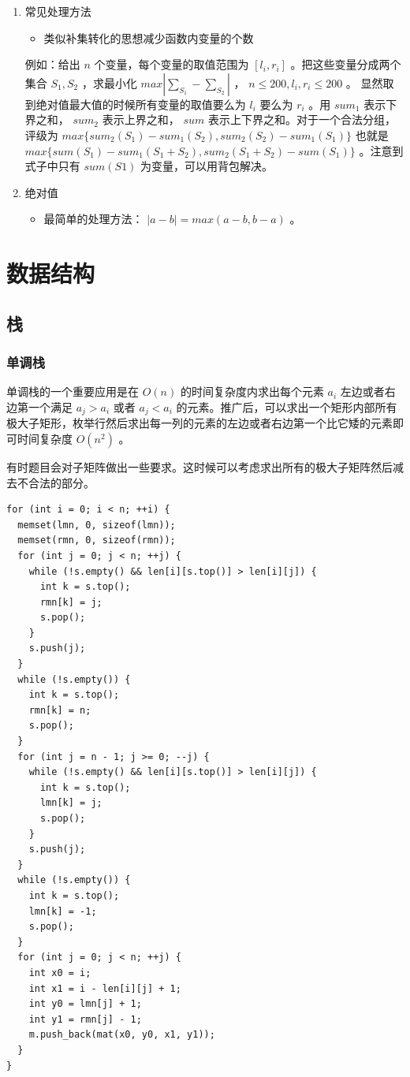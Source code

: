 \documentclass[11pt]{article}
\begin{document}
\begin{enumerate}
\item 常见处理方法
\label{sec-3-5-1-1}

\begin{itemize}
\item 类似补集转化的思想减少函数内变量的个数
\end{itemize}

例如：给出 $n$ 个变量，每个变量的取值范围为 $[l_i,r_i]$ 。把这些变量分成两个集合 $S_1,S_2$ ，求最小化 $max|\sum_{S_1}-\sum_{S_2}|$ ， $n \leq 200, l_i, r_i \leq 200$ 。 显然取到绝对值最大值的时候所有变量的取值要么为 $l_i$ 要么为 $r_i$ 。用 $sum_1$ 表示下界之和， $sum_2$ 表示上界之和， $sum$ 表示上下界之和。对于一个合法分组，评级为 $max\{sum_2(S_1)-sum_1(S_2),sum_2(S_2)-sum_1(S_1)\}$ 也就是 $max\{sum(S_1)-sum_1(S_1+S_2),sum_2(S_1+S_2)-sum(S_1)\}$ 。注意到式子中只有 $sum(S1)$ 为变量，可以用背包解决。

\item 绝对值
\label{sec-3-5-1-2}

\begin{itemize}
\item 最简单的处理方法： $|a-b| = max(a - b, b - a)$ 。
\end{itemize}
\end{enumerate}
\section{数据结构}
\label{sec-4}
\subsection{栈}
\label{sec-4-1}
\subsubsection{单调栈}
\label{sec-4-1-1}

单调栈的一个重要应用是在 $O(n)$ 的时间复杂度内求出每个元素 $a_i$ 左边或者右边第一个满足 $a_j > a_i$ 或者 $a_j < a_i$ 的元素。推广后，可以求出一个矩形内部所有极大子矩形，枚举行然后求出每一列的元素的左边或者右边第一个比它矮的元素即可时间复杂度 $O(n^2)$ 。

有时题目会对子矩阵做出一些要求。这时候可以考虑求出所有的极大子矩阵然后减去不合法的部分。

\begin{verbatim}
for (int i = 0; i < n; ++i) {
  memset(lmn, 0, sizeof(lmn));
  memset(rmn, 0, sizeof(rmn));
  for (int j = 0; j < n; ++j) {
    while (!s.empty() && len[i][s.top()] > len[i][j]) {
      int k = s.top();
      rmn[k] = j;
      s.pop();
    }
    s.push(j);
  }
  while (!s.empty()) {
    int k = s.top();
    rmn[k] = n;
    s.pop();
  }
  for (int j = n - 1; j >= 0; --j) {
    while (!s.empty() && len[i][s.top()] > len[i][j]) {
      int k = s.top();
      lmn[k] = j;
      s.pop();
    }
    s.push(j);
  }
  while (!s.empty()) {
    int k = s.top();
    lmn[k] = -1;
    s.pop();
  }
  for (int j = 0; j < n; ++j) {
    int x0 = i;
    int x1 = i - len[i][j] + 1;
    int y0 = lmn[j] + 1;
    int y1 = rmn[j] - 1;
    m.push_back(mat(x0, y0, x1, y1));
  }
}
\end{verbatim}
\end{document}
